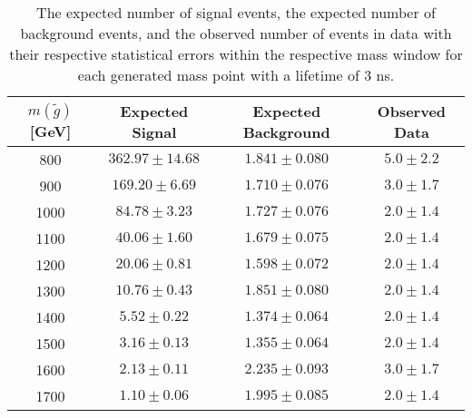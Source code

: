 \begin{table}[!htbp]
  \begin{center}
    \begin{tabular}{cccc}
      \hline
      $m(\tilde{g})$ [GeV]  & Expected Signal & Expected Background & Observed Data\\ 
      \hline
      800    & $362.97 \pm 14.68 $ & $1.841 \pm 0.080 $ & $5.0 \pm 2.2$ \\
      900    & $169.20 \pm 6.69 $  & $1.710 \pm 0.076 $ & $3.0 \pm 1.7$ \\
      1000    & $84.78 \pm 3.23 $  & $1.727 \pm 0.076 $ & $2.0 \pm 1.4$ \\
      1100    & $40.06 \pm 1.60 $  & $1.679 \pm 0.075 $ & $2.0 \pm 1.4$ \\
      1200    & $20.06 \pm 0.81 $  & $1.598 \pm 0.072 $ & $2.0 \pm 1.4$ \\
      1300    & $10.76 \pm 0.43 $  & $1.851 \pm 0.080 $ & $2.0 \pm 1.4$ \\
      1400    & $5.52 \pm 0.22 $   & $1.374 \pm 0.064 $ & $2.0 \pm 1.4$ \\
      1500    & $3.16 \pm 0.13 $   & $1.355 \pm 0.064 $ & $2.0 \pm 1.4$ \\
      1600    & $2.13 \pm 0.11 $   & $2.235 \pm 0.093 $ & $3.0 \pm 1.7$ \\
      1700    & $1.10 \pm 0.06 $   & $1.995 \pm 0.085 $ & $2.0 \pm 1.4$ \\
      \hline
    \end{tabular}
  \end{center}
  \caption{The expected number of signal events, the expected number of background events, and the observed number of events in data with their respective statistical errors within the respective mass window for each generated mass point with a lifetime of 3 ns.}
  \label{tab:app_counts_3ns}
\end{table}


